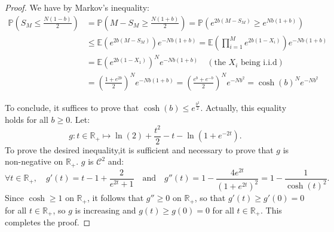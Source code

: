 \documentclass[a4paper,10pt]{report}
\theoremstyle{definition}
\theoremstyle{plain}
\theoremstyle{definition}
\newcommand{\R}{\mathbb{R}}
\newcommand{\E}{\mathbb{E}}
\newcommand{\mC}{\mathcal{C}}
\renewcommand{\(}{\left(}
\renewcommand{\)}{\right)}
\renewcommand{\P}{\mathbb{P}}
\begin{document}
\begin{proof}
We have by Markov's inequality:
\begin{align*}
\P\(S_M\leq\frac{N(1-b)}{2}\)&=\P\(M-S_M\geq\frac{N(1+b)}{2}\)=\P\(e^{2b(M-S_M)}\geq e^{Nb(1+b)}\)\\
&\leq \E\(e^{2b(M-S_M)}\)e^{-Nb(1+b)}= \E\(\prod_{i=1}^M e^{2b(1-X_i)}\)e^{-Nb(1+b)}\\
&=\E(e^{2b(1-X_1)})^Ne^{-Nb(1+b)} \quad (\mbox{the } X_i \mbox{ being i.i.d})\\
&=\(\frac{1+e^{2b}}{2}\)^Ne^{-Nb(1+b)}=\(\frac{e^b+e^{-b}}{2}\)^Ne^{-Nb^2}=\cosh(b)^Ne^{-Nb^2}
\end{align*}

To conclude, it suffices to prove that $\cosh(b)\leq e^{\frac{b^2}{2}}$. Actually, this equality holds for all $b\geq 0$. Let: 
\[g: t\in\R_+\longmapsto \ln(2)+\frac{t^2}{2}-t-\ln\(1+e^{-2t}\).\]
To prove the desired inequality,it is sufficient and necessary to prove that $g$ is non-negative on $\R_+$. $g$ is $\mC^2$ and:
\[\forall t\in\R_+, \quad g'(t)=t-1+\frac{2}{e^{2t}+1} \quad \mbox{and} \quad g''(t)=1-\frac{4e^{2t}}{(1+e^{2t})^2}=1-\frac{1}{\cosh(t)^2}.\]
Since $\cosh\geq 1 $ on $\R_+$, it follows that $g''\geq 0$ on $\R_+$, so that $g'(t)\geq g'(0)=0$ for all $t\in\R_+$, so $g$ is increasing and $g(t)\geq g(0)=0$ for all $t\in\R_+$. This completes the proof.
\end{proof}
\end{document}
